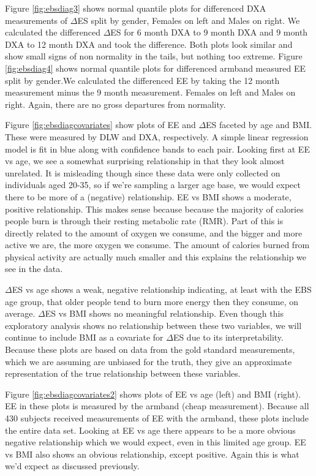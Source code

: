 \documentclass[11pt]{article}\usepackage[]{graphicx}\usepackage[]{color}
\begin{document}
Figure \eqref{fig:ebsdiag3} shows normal quantile plots for differenced DXA measurements of $\Delta$ES split by gender, Females on left and Males on right. We calculated the differenced $\Delta$ES for 6 month DXA to 9 month DXA and 9 month DXA to 12 month DXA and took the difference. Both plots look similar and show small signs of non normality in the tails, but nothing too extreme. Figure \eqref{fig:ebsdiag4} shows normal quantile plots for differenced armband measured EE split by gender.We calculated the differenced EE by taking the 12 month measurement minus the 9 month measurement. Females on left and Males on right. Again, there are no gross departures from normality. 

Figure \eqref{fig:ebsdiagcovariates} show plots of EE and $\Delta$ES faceted by age and BMI. These were measured by DLW and DXA, respectively. A simple linear regression model is fit in blue along with confidence bands to each pair. Looking first at EE vs age, we see a somewhat surprising relationship in that they look almost unrelated. It is misleading though since these data were only collected on individuals aged 20-35, so if we're sampling a larger age base, we would expect there to be more of a (negative) relationship. EE vs BMI shows a moderate, positive relationship. This makes sense because because the majority of calories people burn is through their resting metabolic rate (RMR). Part of this is directly related to the amount of oxygen we consume, and the bigger and more active we are, the more oxygen we consume. The amount of calories burned from physical activity are actually much smaller and this explains the relationship we see in the data.

$\Delta$ES vs age shows a weak, negative relationship indicating, at least with the EBS age group, that older people tend to burn more energy then they consume, on average. $\Delta$ES vs BMI shows no meaningful relationship. Even though this exploratory analysis shows no relationship between these two variables, we will continue to include BMI as a covariate for $\Delta$ES due to its interpretability. Because these plots are based on data from the gold standard measurements, which we are assuming are unbiased for the truth, they give an approximate representation of the true relationship between these variables.

Figure \eqref{fig:ebsdiagcovariates2} shows plots of EE vs age (left) and BMI (right). EE in these plots is measured by the armband (cheap measurement). Because all 430 subjects received measurements of EE with the armband, these plots include the entire data set. Looking at EE vs age there appears to be a more obvious negative relationship which we would expect, even in this limited age group. EE vs BMI also shows an obvious relationship, except positive. Again this is what we'd expect as discussed previously. 
\end{document}

